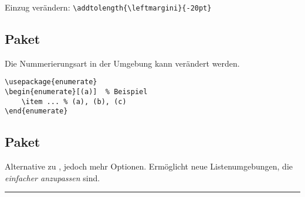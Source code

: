 \vspace{-0.5\baselineskip}
\noindent Einzug verändern:\newline
\lstinline|\addtolength{\leftmargini}{-20pt}|

\subsection{Paket }
Die Nummerierungsart in der Umgebung  kann verändert werden.
\begin{lstlisting}
\usepackage{enumerate}
\begin{enumerate}[(a)]	% Beispiel
	\item ... % (a), (b), (c)
\end{enumerate}
\end{lstlisting}

\subsection{Paket }
\negAbstand
Alternative  zu , jedoch mehr Optionen.
Ermöglicht neue Listenumgebungen, die \emph{einfacher anzupassen} sind.



\hrule \vspace{0.5\baselineskip}
